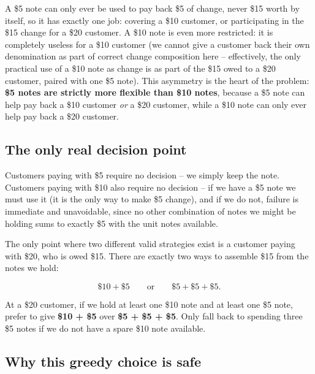 A \$5 note can only ever be used to pay back \$5 of change, never \$15
worth by itself, so it has exactly one job: covering a \$10 customer, or
participating in the \$15 change for a \$20 customer. A \$10 note is even
more restricted: it is completely useless for a \$10 customer (we cannot
give a customer back their own denomination as part of correct change
composition here -- effectively, the only practical use of a \$10 note as
change is as part of the \$15 owed to a \$20 customer, paired with one \$5
note). This asymmetry is the heart of the problem: \textbf{\$5 notes are
strictly more flexible than \$10 notes}, because a \$5 note can help pay
back a \$10 customer \emph{or} a \$20 customer, while a \$10 note can only
ever help pay back a \$20 customer.

\subsection*{The only real decision point}

Customers paying with \$5 require no decision -- we simply keep the note.
Customers paying with \$10 also require no decision -- if we have a \$5 note
we must use it (it is the only way to make \$5 change), and if we do not,
failure is immediate and unavoidable, since no other combination of notes we
might be holding sums to exactly \$5 with the unit notes available.

The only point where two different valid strategies exist is a customer
paying with \$20, who is owed \$15. There are exactly two ways to assemble
\$15 from the notes we hold:

\[
  \$10 + \$5 \qquad \text{or} \qquad \$5 + \$5 + \$5.
\]

\begin{ideabox}
At a \$20 customer, if we hold at least one \$10 note and at least one \$5
note, prefer to give \textbf{\$10 + \$5} over \textbf{\$5 + \$5 + \$5}. Only
fall back to spending three \$5 notes if we do not have a spare \$10 note
available.
\end{ideabox}

\subsection*{Why this greedy choice is safe}

